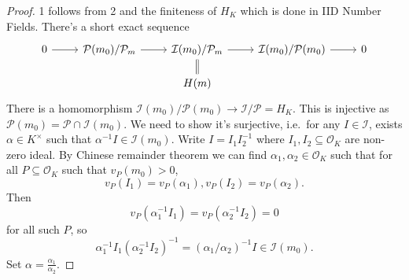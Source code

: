 \documentclass[a4paper]{article}
\renewcommand*{\O}{\mathcal{O}}
\begin{document}
\begin{proof}
  1 follows from 2 and the finiteness of \(H_K\) which is done in IID Number Fields. There's a short exact sequence
  \[
    \begin{tikzcd}[row sep=scriptsize]
      0 \ar[r] & \mathcal P(m_0)/\mathcal P_m \ar[r] & \mathcal I(m_0)/\mathcal P_m \ar[r] \ar[d, equal] & \mathcal I(m_0)/\mathcal P(m_0) \ar[r] & 0 \\
      & & H(m)
    \end{tikzcd}
  \]
  There is a homomorphism \(\mathcal I(m_0)/\mathcal P(m_0) \to \mathcal I/ \mathcal P = H_K\). This is injective as \(\mathcal P(m_0) = \mathcal P \cap \mathcal I(m_0)\). We need to show it's surjective, i.e.\ for any \(I \in \mathcal I\), exists \(\alpha \in K^\times\) such that \(\alpha^{-1} I \in \mathcal I(m_0)\). Write \(I = I_1 I_2^{-1}\) where \(I_1, I_2 \subseteq \O_K\) are non-zero ideal. By Chinese remainder theorem we can find \(\alpha_1, \alpha_2 \in \O_K\) such that for all \(P \subseteq \O_K\) such that \(v_P(m_0) > 0\),
  \[
    v_P(I_1) = v_P(\alpha_1), v_P(I_2) = v_P(\alpha_2).
  \]
  Then
  \[
    v_P(\alpha_1^{-1} I_1) = v_P(\alpha_2^{-1} I_2) = 0
  \]
  for all such \(P\), so
  \[
    \alpha_1^{-1} I_1 (\alpha_2^{-1} I_2)^{-1} = (\alpha_1/\alpha_2)^{-1} I \in \mathcal I(m_0).
  \]
  Set \(\alpha = \frac{\alpha_1}{\alpha_2}\).


\end{proof}
\end{document}
